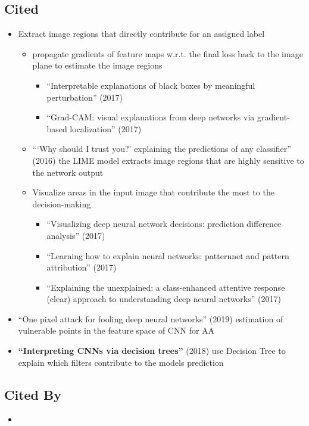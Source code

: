 \documentclass{article}
\begin{document}
\subsection*{Cited}
\begin{itemize}
	\item Extract image regions that directly contribute for an assigned label
	\begin{itemize}
		\item propagate gradients of feature maps w.r.t. the final loss back to the image plane to estimate the image regions
		\begin{itemize}
			\item ``Interpretable explanations of black boxes by meaningful perturbation'' (2017)
			\item ``Grad-CAM: visual explanations from deep networks via gradient-based localization'' (2017)
		\end{itemize}
		\item ```Why should I trust you?' explaining the predictions of any classifier'' (2016) the LIME model extracts image regions that are highly sensitive to the network output
		\item Visualize areas in the input image that contribute the most to the decision-making
		\begin{itemize}
			\item ``Visualizing deep neural network decisions: prediction difference analysis'' (2017)
			\item ``Learning how to explain neural networks: patternnet and pattern attribution'' (2017)
			\item ``Explaining the unexplained: a class-enhanced attentive response (clear) approach to understanding deep neural networks'' (2017)
		\end{itemize}
	\end{itemize}
	\item ``One pixel attack for fooling deep neural networks'' (2019) estimation of vulnerable points in the feature space of CNN for AA
	\item \textbf{``Interpreting CNNs via decision trees''} (2018) use Decision Tree to explain which filters contribute to the models prediction
\end{itemize}

\subsection*{Cited By}
\begin{itemize}
	\item
\end{itemize}
\end{document}
